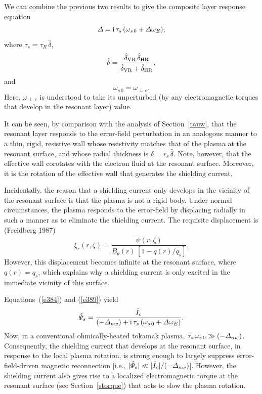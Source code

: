 \documentclass[notitlepage,12pt]{article}
\begin{document}
We can combine the previous two results to give the composite layer response equation
\begin{equation}\label{e389}
{\mit\Delta} = {\rm i}\,\tau_s\,(\omega_{s\,0}+ {\mit\Delta}\omega_E),
\end{equation}
where $\tau_s=\tau_R\,\hat{\delta}$, 
\begin{equation}
\hat{\delta} = \frac{\hat{\delta}_{\rm VR}\,\hat{\delta}_{\rm HR}}{\hat{\delta}_{\rm VR} + \hat{\delta}_{\rm HR}},
\end{equation}
and 
\begin{equation}
\omega_{s\,0}= \omega_{\perp\,e}.
\end{equation} 
Here, $\omega_{\perp\,e}$ is understood to take its unperturbed (by any electromagnetic torques that
develop in the resonant layer) value. 

It can be seen, by comparison with the analysis of Section~\ref{tauw}, that the resonant layer responds to the error-field
perturbation in an analogous manner to a thin, rigid, resistive wall whose resistivity matches that of the plasma at the
resonant surface, and whose radial thickness is $\delta=r_s\,\hat{\delta}$. Note, however, that the effective wall corotates with the
electron fluid at the resonant surface. Moreover, it is the rotation of the effective wall that generates the shielding current. 

Incidentally, the reason that a shielding current only develops in the vicinity of the resonant surface is that the plasma is
not a rigid body. Under normal circumstances, the plasma responds to the error-field by displacing radially in such a
manner as to eliminate the shielding current. The requisite displacement is (Freidberg 1987)
\begin{equation}
\xi_r(r,\zeta) = \frac{\tilde{\psi}(r,\zeta)}{B_\theta(r)\,[1-q(r)/q_s]}.
\end{equation}
However, this displacement becomes infinite at the resonant surface, where $q(r)=q_s$, which explains why a shielding
current is only excited in the immediate vicinity of this surface. 

Equations~(\ref{e384}) and (\ref{e389}) yield
\begin{equation}\label{e392}
\hat{\mit\Psi}_s=\frac{\tilde{I}_c}{(-{\mit\Delta}_{nw})+ {\rm i}\,\tau_s\,(\omega_{s\,0}+ {\mit\Delta}\omega_E)}.
\end{equation}
Now, in a conventional ohmically-heated tokamak plasma, $\tau_s\,\omega_{s\,0}\gg (-{\mit\Delta}_{nw})$. Consequently, the
shielding current that develops at the resonant surface, in response to the local plasma rotation, is strong enough to largely
suppress error-field-driven magnetic reconnection [i.e., $|\hat{\mit\Psi}_s|\ll |\tilde{I}_c|/(-{\mit\Delta}_{nw})$]. However, the shielding current also gives rise to a localized electromagnetic
torque at the resonant surface (see Section~\ref{storque}) that acts to slow the plasma rotation. 
\end{document}

